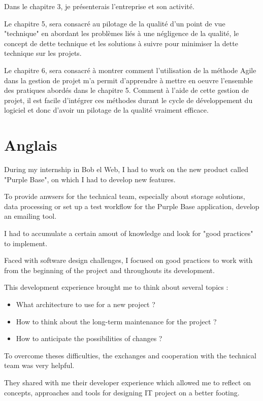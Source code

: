 Dans le chapitre 3, je présenterais l'entreprise et son activité. 

Le chapitre 5, sera consacré au pilotage de la qualité d'un point de vue "technique" en abordant les problèmes liés à une négligence de la qualité, le concept de dette technique et les solutions à suivre pour minimiser la dette technique sur les projets.

Le chapitre 6, sera consacré à montrer comment l'utilisation de la méthode Agile dans la gestion de projet m'a permit d'apprendre à mettre en oeuvre l'ensemble des pratiques abordés dans le chapitre 5.
Comment à l'aide de cette gestion de projet, il est facile d'intégrer ces méthodes durant le cycle de développement du logiciel et donc d'avoir un pilotage de la qualité vraiment efficace.


\section{Anglais}

During my internship in Bob el Web, I had to work on the new product called "Purple Base", on which I had to develop new features. 

To provide anwsers for the technical team, especially about storage solutions, data processing or set up a test workflow for the Purple Base application, develop an emailing tool. 

I had to accumulate a certain amout of knowledge and look for "good practices" to implement. 

Faced with software design challenges, I focused on good practices to work with from the beginning of the project and throughouts its development. 

This development experience brought me to think about several topics : 

\begin{itemize}
\item What architecture to use for a new project ? 
\item How to think about the long-term maintenance for the project ?
\item How to anticipate the possibilities of changes ?
\end{itemize}

To overcome theses difficulties, the exchanges and cooperation with the technical team was very helpful. 

They shared with me their developer experience which allowed me to reflect on concepts, approaches and tools for designing IT project on a better footing. 


